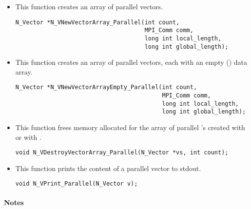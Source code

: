 \begin{itemize}

\item {}
 
  This function creates an array of  parallel vectors.
 
\begin{verbatim}
N_Vector *N_VNewVectorArray_Parallel(int count, 
                                     MPI_Comm comm, 
                                     long int local_length,
                                     long int global_length);
\end{verbatim}


\item {}
 
  This function creates an array of  parallel vectors,
  each with an empty () data array.
 
\begin{verbatim}
N_Vector *N_VNewVectorArrayEmpty_Parallel(int count, 
                                          MPI_Comm comm, 
                                          long int local_length,
                                          long int global_length);
\end{verbatim}


\item {}
 
 This function frees memory allocated for the array of  parallel 's 
 created with  or with .

 

 \verb|void N_VDestroyVectorArray_Parallel(N_Vector *vs, int count);|



\item {}
  
  This function prints the content of a parallel vector to stdout.
 
  
  
  \verb|void N_VPrint_Parallel(N_Vector v);|


\end{itemize}
\paragraph{\bf Notes} 
           

